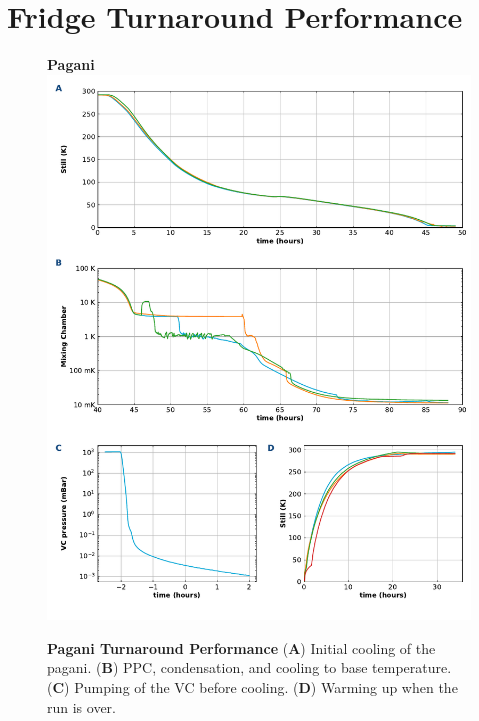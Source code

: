 \documentclass{article}[18pt,A4]
\begin{document}
\section{Fridge Turnaround Performance}



\begin{figure}[t]
\centering
\textbf{\color{sectioncolor}Pagani}
\includegraphics{fig/pagani_performance.pdf}
\caption{\textbf{Pagani Turnaround Performance}
(\textbf{\color{sectioncolor}A}) Initial cooling of the pagani.
(\textbf{\color{sectioncolor}B}) PPC, condensation, and cooling to base temperature.
(\textbf{\color{sectioncolor}C}) Pumping of the VC before cooling.
(\textbf{\color{sectioncolor}D}) Warming up when the run is over.
}
\end{figure}
\end{document}
